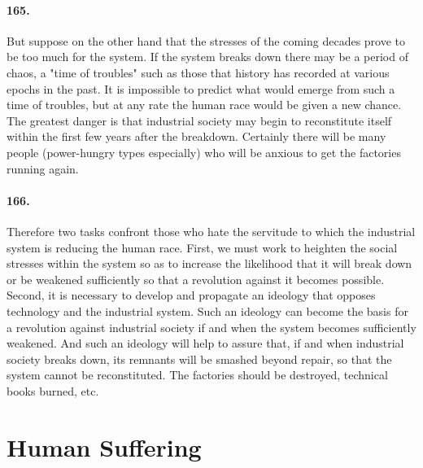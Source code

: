 \documentclass[12pt]{book}
\newcommand{\mysection}[1]{\section*{#1} \addcontentsline{toc}{section}{#1}}
\begin{document}
\paragraph{165.} But suppose on the other hand that the stresses of the coming decades prove to be too much for the system. If the system breaks down there may be a period of chaos, a "time of troubles" such as those that history has recorded at various epochs in the past. It is impossible to predict what would emerge from such a time of troubles, but at any rate the human race would be given a new chance. The greatest danger is that industrial society may begin to reconstitute itself within the first few years after the breakdown. Certainly there will be many people (power-hungry types especially) who will be anxious to get the factories running again.


\paragraph{166.} Therefore two tasks confront those who hate the servitude to which the industrial system is reducing the human race. First, we must work to heighten the social stresses within the system so as to increase the likelihood that it will break down or be weakened sufficiently so that a revolution against it becomes possible. Second, it is necessary to develop and propagate an ideology that opposes technology and the industrial system.  Such an ideology can become the basis for a revolution against industrial society if and when the system becomes sufficiently weakened. And such an ideology will help to assure that, if and when industrial society breaks down, its remnants will be smashed beyond repair, so that the system cannot be reconstituted. The factories should be destroyed, technical books burned, etc.

\mysection{Human Suffering}
\end{document}
